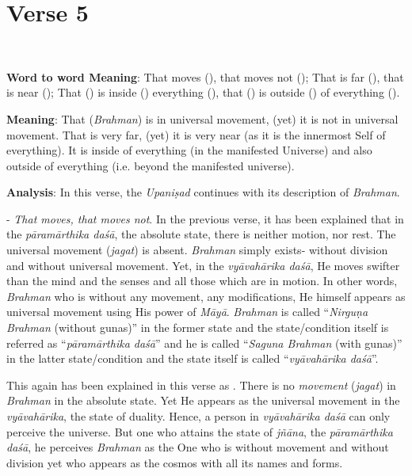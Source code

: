\chapter{Verse 5}

\begin{moolashloka}
\\
\end{moolashloka}

\textbf{Word to word Meaning}: That moves (), that moves not (); That is far (), that is near (); That () is inside () everything (), that () is outside () of everything ().

\textbf{Meaning}: That (\emph{Brahman}) is in universal movement, (yet) it is not in universal movement. That is very far, (yet) it is very near (as it is the innermost Self of everything). It is inside of everything (in the manifested Universe) and also outside of everything (i.e. beyond the manifested universe).

\textbf{Analysis}: In this verse, the \emph{Upaniṣad} continues with its description of \emph{Brahman}.

- \emph{That moves, that moves not}. In the previous verse, it has been explained that in the \emph{pāramārthika daśā}, the absolute state, there is neither motion, nor rest. The universal movement (\emph{jagat}) is absent. \emph{Brahman} simply exists- without division and without universal movement. Yet, in the \emph{vyāvahārika daśā}, He moves swifter than the mind and the senses and all those which are in motion. In other words, \emph{Brahman} who is without any movement, any modifications, He himself appears as universal movement using His power of \emph{Māyā}. \emph{Brahman} is called ``\emph{Nirguṇa Brahman} (without gunas)'' in the former state and the state/condition itself is referred as ``\emph{pāramārthika daśā}'' and he is called ``\emph{Saguna Brahman} (with gunas)'' in the latter state/condition and the state itself is called ``\emph{vyāvahārika daśā}''.

This again has been explained in this verse as . There is no \emph{movement} (\emph{jagat}) in \emph{Brahman} in the absolute state. Yet He appears as the universal movement in the \emph{vyāvahārika}, the state of duality. Hence, a person in \emph{vyāvahārika daśā} can only perceive the universe. But one who attains the state of \emph{jñāna}, the \emph{pāramārthika daśā}, he perceives \emph{Brahman} as the One who is without movement and without division yet who appears as the cosmos with all its names and forms.

